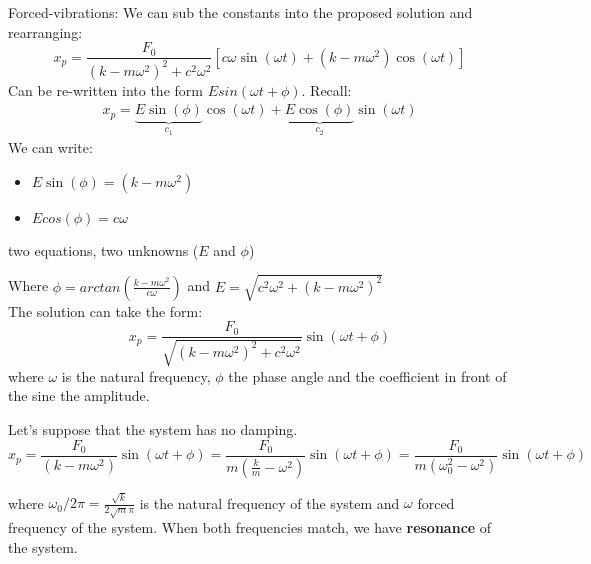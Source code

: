 \begin{exmp}{Forced-vibrations:}
We can sub the constants into the proposed solution and rearranging:
\begin{equation*}
x_p=\frac{F_0 }{(k-m\omega^2)^2+c^2\omega^2}\left[c\omega \sin(\omega t)+(k-m\omega^2)\cos(\omega t)\right]
\end{equation*}
Can be re-written into the form $Esin(\omega t+\phi)$. Recall:
\begin{align*}
x_p=\underbrace{E\sin(\phi)}_{c_1} \cos(\omega t)+\underbrace{E\cos(\phi)}_{c_2} \sin(\omega t)
\end{align*}
We can write:
\begin{itemize}
\item $E\sin(\phi)=(k-m\omega^2)$
\item $Ecos(\phi)=c\omega$
\end{itemize}
two equations, two unknowns ($E$ and $\phi$)

Where $\phi=arctan\left(\frac{k-m\omega^2}{c \omega}\right)$ and $E=\sqrt{c^2\omega^2+(k-m\omega^2)^2}$\\
The solution can take the form:
\begin{equation*}
x_p=\frac{F_0 }{\sqrt{(k-m\omega^2)^2+c^2\omega^2}}\sin\left(\omega t + \phi \right)
\end{equation*}
where $\omega$ is the natural frequency, $\phi$ the phase angle and the coefficient in front of the sine the amplitude.
\end{exmp}



Let's suppose that the system has no damping.
\begin{equation*}
x_p=\frac{F_0 }{{(k-m\omega^2)}}\sin\left(\omega t + \phi \right)=\frac{F_0 }{{m(\frac{k}{m}-\omega^2)}}\sin\left(\omega t + \phi \right)=\frac{F_0 }{{m(\omega^2_0-\omega^2)}}\sin\left(\omega t + \phi \right)
\end{equation*}

where $\omega_0/2\pi = \frac{\sqrt{k}}{2\sqrt{m}\pi}$ is the natural frequency of the system and $\omega$ forced frequency of the system. When both frequencies match, we have \textbf{resonance} of the system.


